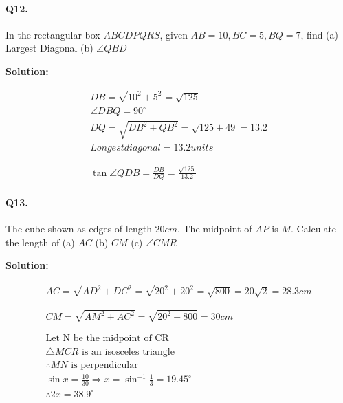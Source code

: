 \documentclass{article}
\begin{document}
\paragraph{Q12.}
In the rectangular box $ABCDPQRS$, given $AB=10, BC=5, BQ=7$, find (a) Largest Diagonal (b) $\angle QBD$

{\scriptsize \textbf{Solution:}}

\[
  \begin{aligned}
    DB = \sqrt{10^{2}+5^{2}} = \sqrt{125} \\
    \angle DBQ = 90^{\circ} \\
    DQ = \sqrt{DB^{2}+QB^{2}} = \sqrt{125+49} = 13.2 \\
    Longest diagonal = 13.2 units \\
    \\
    \\
    \tan \angle QDB = \frac{DB}{DQ} = \frac{\sqrt{125}}{13.2}
  \end{aligned}
\]

\paragraph{Q13.}
The cube shown as edges of length $20cm$. The midpoint of $AP$ is $M$. Calculate the length of (a) $AC$ (b) $CM$ (c) $\angle CMR$

{\scriptsize \textbf{Solution:}}

\[
  \begin{aligned}
    AC = \sqrt{AD^{2} + DC^{2}} = \sqrt{20^{2} + 20^{2}} = \sqrt{800} = 20 \sqrt{2} = 28.3cm \\
    \\
    \\
    CM = \sqrt{AM^{2} + AC^{2}} = \sqrt{20^{2} + 800} = 30cm \\
    \\
    \\
    \text{Let N be the midpoint of CR} \\
    \triangle MCR \text{ is an isosceles triangle} \\
    \therefore MN \text{ is perpendicular} \\
    \sin x = \frac{10}{30} \Rightarrow x = \sin^{-1}\frac{1}{3}  = 19.45^{\circ} \\
    \therefore 2x = 38.9^{\circ}
  \end{aligned}
\]
\end{document}
